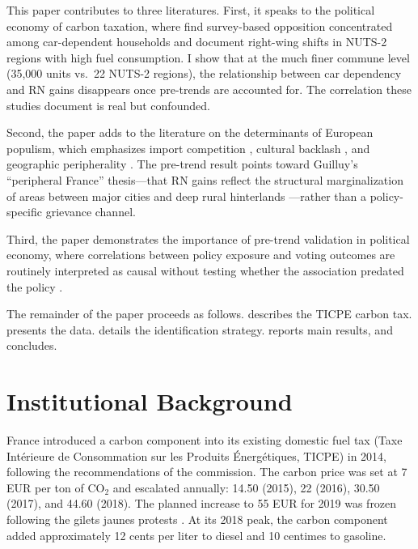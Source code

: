 \documentclass[12pt]{article}
\begin{document}
This paper contributes to three literatures. First, it speaks to the political economy of carbon taxation, where \citet{douenne2022yellow} find survey-based opposition concentrated among car-dependent households and \citet{konradt2024carbon} document right-wing shifts in NUTS-2 regions with high fuel consumption. I show that at the much finer commune level (35,000 units vs.~22 NUTS-2 regions), the relationship between car dependency and RN gains disappears once pre-trends are accounted for. The correlation these studies document is real but confounded.

Second, the paper adds to the literature on the determinants of European populism, which emphasizes import competition \citep{colantone2018trade, autor2020importing}, cultural backlash \citep{norris2019cultural}, and geographic peripherality \citep{rodriguez2018revenge}. The pre-trend result points toward Guilluy's ``peripheral France'' thesis---that RN gains reflect the structural marginalization of areas between major cities and deep rural hinterlands \citep{guilluy2014france}---rather than a policy-specific grievance channel.

Third, the paper demonstrates the importance of pre-trend validation in political economy, where correlations between policy exposure and voting outcomes are routinely interpreted as causal without testing whether the association predated the policy \citep{de2020does}.

The remainder of the paper proceeds as follows.  describes the TICPE carbon tax.  presents the data.  details the identification strategy.  reports main results, and  concludes.


\section{Institutional Background}
\label{sec:background}

France introduced a carbon component into its existing domestic fuel tax (Taxe Int\'{e}rieure de Consommation sur les Produits \'{E}nerg\'{e}tiques, TICPE) in 2014, following the recommendations of the \citet{quinet2009value} commission. The carbon price was set at 7 EUR per ton of CO$_2$ and escalated annually: 14.50 (2015), 22 (2016), 30.50 (2017), and 44.60 (2018). The planned increase to 55 EUR for 2019 was frozen following the gilets jaunes protests \citep{bureau2019can}. At its 2018 peak, the carbon component added approximately 12 cents per liter to diesel and 10 centimes to gasoline.
\end{document}
